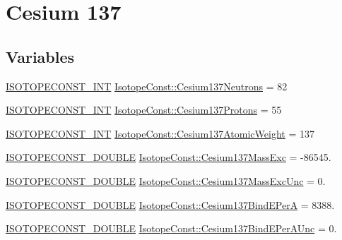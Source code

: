 \hypertarget{group___isotope_const-_cesium-_cs137}{}\section{Cesium 137}
\label{group___isotope_const-_cesium-_cs137}
\subsection*{Variables}
\begin{DoxyCompactItemize}
\item 
\mbox{\hyperlink{group___isotope_const-_macros_ga5f18360b3e99483a35c32d789e62621c}{I\+S\+O\+T\+O\+P\+E\+C\+O\+N\+S\+T\+\_\+\+I\+NT}} \mbox{\hyperlink{group___isotope_const-_cesium-_cs137_ga5914fd08132410b13def09352e921f26}{Isotope\+Const\+::\+Cesium137\+Neutrons}} = 82
\item 
\mbox{\hyperlink{group___isotope_const-_macros_ga5f18360b3e99483a35c32d789e62621c}{I\+S\+O\+T\+O\+P\+E\+C\+O\+N\+S\+T\+\_\+\+I\+NT}} \mbox{\hyperlink{group___isotope_const-_cesium-_cs137_gafc060550409acb828c02fa859cf84b95}{Isotope\+Const\+::\+Cesium137\+Protons}} = 55
\item 
\mbox{\hyperlink{group___isotope_const-_macros_ga5f18360b3e99483a35c32d789e62621c}{I\+S\+O\+T\+O\+P\+E\+C\+O\+N\+S\+T\+\_\+\+I\+NT}} \mbox{\hyperlink{group___isotope_const-_cesium-_cs137_gacf61ae78872c849238452fcec09c91c3}{Isotope\+Const\+::\+Cesium137\+Atomic\+Weight}} = 137
\item 
\mbox{\hyperlink{group___isotope_const-_macros_ga8f45a7272ce02c0b4c65c44636ed719a}{I\+S\+O\+T\+O\+P\+E\+C\+O\+N\+S\+T\+\_\+\+D\+O\+U\+B\+LE}} \mbox{\hyperlink{group___isotope_const-_cesium-_cs137_ga06e69f3943aa100a4caf3940e804d050}{Isotope\+Const\+::\+Cesium137\+Mass\+Exc}} = -\/86545.
\item 
\mbox{\hyperlink{group___isotope_const-_macros_ga8f45a7272ce02c0b4c65c44636ed719a}{I\+S\+O\+T\+O\+P\+E\+C\+O\+N\+S\+T\+\_\+\+D\+O\+U\+B\+LE}} \mbox{\hyperlink{group___isotope_const-_cesium-_cs137_gaf39ff51fbe6efaa5318994e228fe54f2}{Isotope\+Const\+::\+Cesium137\+Mass\+Exc\+Unc}} = 0.
\item 
\mbox{\hyperlink{group___isotope_const-_macros_ga8f45a7272ce02c0b4c65c44636ed719a}{I\+S\+O\+T\+O\+P\+E\+C\+O\+N\+S\+T\+\_\+\+D\+O\+U\+B\+LE}} \mbox{\hyperlink{group___isotope_const-_cesium-_cs137_ga0a7179e7fa66d9d926493d7a9b5356e3}{Isotope\+Const\+::\+Cesium137\+Bind\+E\+PerA}} = 8388.
\item 
\mbox{\hyperlink{group___isotope_const-_macros_ga8f45a7272ce02c0b4c65c44636ed719a}{I\+S\+O\+T\+O\+P\+E\+C\+O\+N\+S\+T\+\_\+\+D\+O\+U\+B\+LE}} \mbox{\hyperlink{group___isotope_const-_cesium-_cs137_gacecb5c2ea3ce990b160a470e785a3bf6}{Isotope\+Const\+::\+Cesium137\+Bind\+E\+Per\+A\+Unc}} = 0.

\end{DoxyCompactItemize}
